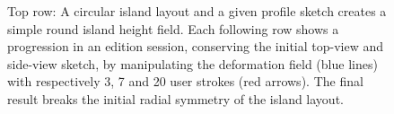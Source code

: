 \begin{figure} 
    \caption[Island deformation through strokes]{Top row: A circular island layout and a given profile sketch creates a simple round island height field. Each following row shows a progression in an edition session, conserving the initial top-view and side-view sketch, by manipulating the deformation field (blue lines) with respectively 3, 7 and 20 user strokes (red arrows). The final result breaks the initial radial symmetry of the island layout. }
    \label{fig:coral-island-wind-stroke-edition}
\end{figure}

